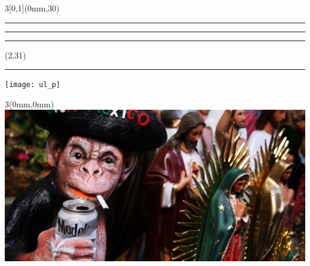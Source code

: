 \begingroup

\textblockorigin{0mm}{0mm}
\setlength{\parindent}{0mm}
\setlength{\banderougewidth}{2\TPHorizModule}
\setlength{\banderougeheight}{\TPVertModule}
\setlength{\bandeorwidth}{\TPHorizModule}
\setlength{\bandeorheight}{\banderougeheight}
\setlength{\imageheight}{29\TPVertModule}
\setlength{\imagewidth}{3\TPHorizModule}
\setlength{\logoheight}{2.5\TPVertModule}
\setlength{\gapwidth}{0.75pt}
\addtolength{\bandeorwidth}{-\gapwidth}
\addtolength{\imageheight}{-\gapwidth}

\begin{frame}[plain]
  \begin{textblock*}{3\TPHorizModule}[0,1](0mm,30\TPVertModule)
    \textcolor{rouge}{\rule{\banderougewidth}{\banderougeheight}}%
    \rule{\gapwidth}{0pt}%
    \textcolor{or}{\rule{\bandeorwidth}{\bandeorheight}}           %
  \end{textblock*}

  \begin{textblock*}{\TPHorizModule}(2\TPHorizModule,31\TPVertModule)
    \rule{\gapwidth}{0pt}%
    \texttt{[image: ul\_p]}
  \end{textblock*}

  \begin{textblock*}{3\TPHorizModule}(0mm,0mm)
    \includegraphics[height=\imageheight,width=\imagewidth]{1280px-Mexican_curious_monkey}
  \end{textblock*}


\end{frame}
